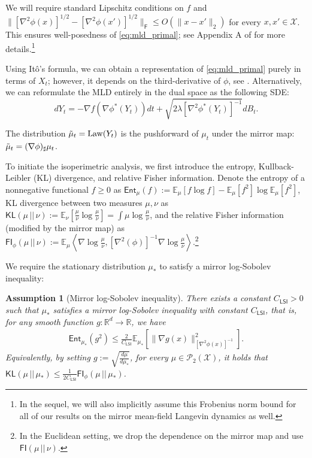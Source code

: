 \documentclass{article}
\newtheorem{assumption}{Assumption}
\newcommand{\CLSI}[0]{C_{\mathsf{LSI}}}
\newcommand{\sep}[0]{\,||\,}
\newcommand{\KL}[0]{\mathsf{KL}}
\newcommand{\FI}[0]{\mathsf{FI}}
\begin{document}
We will require standard Lipschitz conditions on $f$ \citep{øksendal2010stochastic} and $\|[\nabla^2\phi(x)]^{1/2}-[\nabla^2\phi(x')]^{1/2}\|_\mathsf{F}\le O(\|x-x'\|_2)$ for every $x,x'\in \mathcal{X}$. This ensures well-posedness of \eqref{eq:mld_primal}; see Appendix A of 
\citet{zhang2020wasserstein} for more details.\footnote{In the sequel, we will also implicitly assume this Frobenius norm bound for all of our results on the mirror mean-field Langevin dynamics as well.}


Using It\^o's formula, we can obtain a representation of \eqref{eq:mld_primal} purely in terms of $X_t$; however, it depends on the third-derivative of $\phi$, see \citep[Exercise 10.1]{chewi2023logconcavesampling}. Alternatively, we can reformulate the MLD entirely in the dual space as the following SDE:
\begin{equation*}
dY_t = - \nabla f(\nabla\phi^*(Y_t))dt + \sqrt{2\lambda[\nabla^2\phi^*(Y_t)]^{-1}}dB_t.
\end{equation*}

The distribution $\Tilde{\mu}_t = \operatorname{Law}(Y_t)$ is the pushforward of $\mu_t$ under the mirror map: $\Tilde{\mu}_t = (\nabla\phi)_\sharp \mu_t$.

To initiate the isoperimetric analysis, we first introduce the entropy, Kullback-Leibler (KL) divergence, and relative Fisher information. Denote the entropy of a nonnegative functional $f\ge 0$ as $\mathsf{Ent}_\mu(f) :=\mathbb{E}_\mu[f\log f] - \mathbb{E}_{\mu}[f^2]\log\mathbb{E}_\mu[f^2]$, 
KL divergence between two measures $\mu,\nu$ as $\KL(\mu\sep\nu) := \mathbb{E}_\nu\left[\frac{\mu}{\nu}\log\frac{\mu}{\nu}\right] = \int \mu\log \frac{\mu}{\nu}$, and the relative Fisher information (modified by the mirror map) as $
\FI_\phi(\mu\sep\nu) := \mathbb{E}_\mu\left\langle\nabla \log \frac{\mu}{\nu},[\nabla^2(\phi)]^{-1}\nabla \log \frac{\mu}{\nu}\right\rangle$.\footnote{In the Euclidean setting, we drop the dependence on the mirror map and use $\FI(\mu\sep\nu)$.}

We require the stationary distribution $\mu_*$ to satisfy a mirror log-Sobolev inequality:
\begin{assumption}[Mirror log-Sobolev inequality]\label{asmp:lsi}
    There exists a constant $\CLSI> 0$ such that $\mu_*$ satisfies a mirror log-Sobolev inequality with constant $\CLSI$, that is, for any smooth function $g:\mathbb{R}^d\to\mathbb{R}$, we have
    \begin{align*}
    \mathsf{Ent}_{\mu_*}(g^2) \le \frac{2}{\CLSI}\mathbb{E}_{\mu_*}\left[\|\nabla g(x)\|^2_{[\nabla^2\phi(x)]^{-1}}\right].
    \end{align*}
    Equivalently, by setting 
    $g := \sqrt{\frac{d\mu}{d\mu_*}}$, for every $\mu \in \mathcal{P}_2(\mathcal{X})$, it holds that $\KL(\mu\sep\mu_*) \le \frac{1}{2\CLSI}\FI_\phi(\mu\sep\mu_*)$.
\end{assumption}
\end{document}
